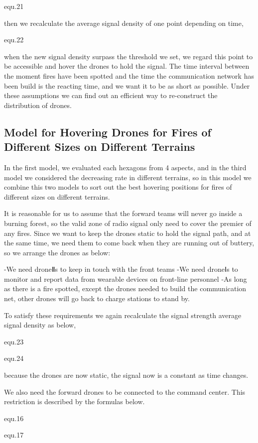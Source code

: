 \documentclass[13pt]{ctexart} %
\begin{document}
{equ.21}

then we recalculate the average signal density of one point depending on time,

{equ.22}

when the new signal density surpass the threshold we set, we regard this point to be accessible and hover the drones to hold the signal. The time interval between the moment fires have been spotted and the time the communication network has been build is the reacting time, and we want it to be as short as possible. Under these assumptions we can find out an efficient way to re-construct the distribution of drones.

\subsection{Model for Hovering Drones for Fires of Different Sizes on Different Terrains}
In the first model, we evaluated each hexagons from 4 aspects, and in the third model we considered the decreasing rate in different terrains, so in this model we combine this two models to sort out the best hovering positions for fires of different sizes on different terrains.

It is reasonable for us to assume that the forward teams will never go inside a burning forest, so the valid zone of radio signal only need to cover the premier of any fires. Since we want to keep the drones static to hold the signal path, and at the same time, we need them to come back when they are running out of buttery, so we arrange the drones as below:

-We need droneⅡs to keep in touch with the front teams
-We need droneⅠs to monitor and report data from wearable devices on front-line personnel
-As long as there is a fire spotted, except the drones needed to build the communication net, other drones will go back to charge stations to stand by.

To satisfy these requirements we again recalculate the signal strength average signal density as below,

{equ.23}

    {equ.24}

because the drones are now static, the signal now is a constant as time changes.

We also need the forward drones to be connected to the command center. This restriction is described by the formulas below.

    {equ.16}

    {equ.17}
\end{document}
